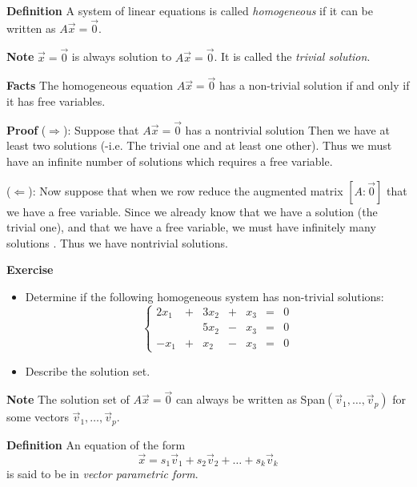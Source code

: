   \begin{frame}[fragile]
\textbf{Definition}  
 A system of linear equations is called {\em homogeneous} if it can be written as 
 $A \vec{x} = \vec{0}$.


\textbf{Note}
$\vec{x}= \vec{0}$ is always solution to $A\vec{x}= \vec{0}$.
It is called the {\em trivial solution}.

\end{frame}

  \begin{frame}[fragile]
\textbf{Facts}
The homogeneous equation $A \vec{x} = \vec{0}$ has a non-trivial 
solution if and only if it has free variables.


\textbf{Proof}
($\Rightarrow$):  Suppose that $A \vec{x} = \vec{0}$ has a nontrivial solution
Then we have at least two solutions (-i.e. The trivial one and at least one other).
Thus we must have an infinite number of solutions which requires a free variable. 

($\Leftarrow$):  Now suppose that when we row reduce the augmented matrix $[A : \vec{0}]$ that we have a free variable. 
Since we already know that we have a solution (the trivial one), and that we have a free variable, we must have infinitely many solutions . 
Thus we have nontrivial solutions.

\end{frame}

  \begin{frame}[fragile]
\textbf{Exercise}
\begin{itemize}
 \item  Determine if the following homogeneous system has non-trivial solutions: 
\[  \left\{
 \begin{array}{rcrcrcr}
  2x_1 & + & 3x_2 &  + & x_3 & = & 0 \\
       &   & 5x_2 &  - & x_3 & = & 0 \\
  -x_1 & + &  x_2 & -  & x_3 & = & 0 
 \end{array}  \right.
\]   
\item  Describe the solution set.
\end{itemize}

\end{frame}

  \begin{frame}[fragile]
\textbf{Note}
The solution set of $A \vec{x} = \vec{0}$ can always be 
written as Span$(\vec{v}_1, \dots, \vec{v}_p)$ for some vectors 
$\vec{v}_1, \dots, \vec{v}_p$.


\textbf{Definition} 
 An equation of the form 
 \[
  \vec{x} = s_1\vec{v}_1 + s_2 \vec{v}_2 + \dots + s_k \vec{v}_k
 \]
is said to be in {\em vector parametric form}.

\end{frame}

